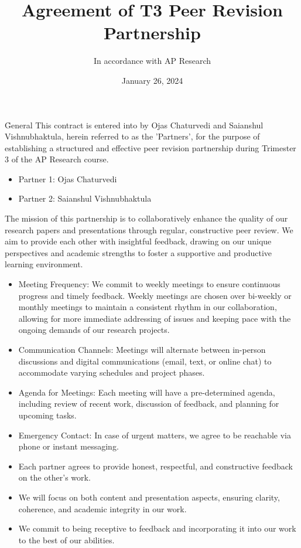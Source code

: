 \documentclass{contract}
\title    {Agreement of T3 Peer Revision Partnership}
\subtitle {In accordance with AP Research}
\date     {January 26, 2024}
\begin{document}
\h{General}
This contract is entered into by Ojas Chaturvedi and Saianshul Vishnubhaktula, herein referred to as the 'Partners', for the purpose of establishing a structured and effective peer revision partnership during Trimester 3 of the AP Research course.

\begin{itemize}
    \item Partner 1: Ojas Chaturvedi
    \item Partner 2: Saianshul Vishnubhaktula
\end{itemize}

The mission of this partnership is to collaboratively enhance the quality of our research papers and presentations through regular, constructive peer review. We aim to provide each other with insightful feedback, drawing on our unique perspectives and academic strengths to foster a supportive and productive learning environment.

\begin{itemize}
    \item Meeting Frequency: We commit to weekly meetings to ensure continuous progress and timely feedback. Weekly meetings are chosen over bi-weekly or monthly meetings to maintain a consistent rhythm in our collaboration, allowing for more immediate addressing of issues and keeping pace with the ongoing demands of our research projects.
    \item Communication Channels: Meetings will alternate between in-person discussions and digital communications (email, text, or online chat) to accommodate varying schedules and project phases.
    \item Agenda for Meetings: Each meeting will have a pre-determined agenda, including review of recent work, discussion of feedback, and planning for upcoming tasks.
    \item Emergency Contact: In case of urgent matters, we agree to be reachable via phone or instant messaging.
\end{itemize}

\begin{itemize}
    \item Each partner agrees to provide honest, respectful, and constructive feedback on the other's work.
    \item We will focus on both content and presentation aspects, ensuring clarity, coherence, and academic integrity in our work.
    \item We commit to being receptive to feedback and incorporating it into our work to the best of our abilities.
\end{itemize}
\end{document}
